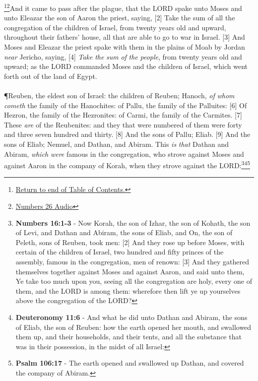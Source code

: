 \footnote{\textcolor[rgb]{0.00,0.25,0.00}{\hyperlink{TOC}{Return to end of Table of Contents.}}}\footnote{\href{https://audiobible.com/bible/numbers_26.html}{\textcolor[cmyk]{0.99998,1,0,0}{Numbers 26 Audio}}}\textcolor[cmyk]{0.99998,1,0,0}{And it came to pass after the plague, that the LORD spake unto Moses and unto Eleazar the son of Aaron the priest, saying,}
[2] \textcolor[cmyk]{0.99998,1,0,0}{Take the sum of all the congregation of the children of Israel, from twenty years old and upward, throughout their fathers' house, all that are able to go to war in Israel.}
[3] \textcolor[cmyk]{0.99998,1,0,0}{And Moses and Eleazar the priest spake with them in the plains of Moab by Jordan \emph{near} Jericho, saying,}
[4] \textcolor[cmyk]{0.99998,1,0,0}{\emph{Take} \emph{the} \emph{sum} \emph{of} \emph{the} \emph{people}, from twenty years old and upward; as the LORD commanded Moses and the children of Israel, which went forth out of the land of Egypt.}\\
\\
\P \textcolor[cmyk]{0.99998,1,0,0}{Reuben, the eldest son of Israel: the children of Reuben; Hanoch, \emph{of} \emph{whom} \emph{cometh} the family of the Hanochites: of Pallu, the family of the Palluites:}
[6] \textcolor[cmyk]{0.99998,1,0,0}{Of Hezron, the family of the Hezronites: of Carmi, the family of the Carmites.}
[7] \textcolor[cmyk]{0.99998,1,0,0}{These \emph{are}  of the Reubenites: and they that were numbered of them were forty and three  seven hundred and thirty.}
[8] \textcolor[cmyk]{0.99998,1,0,0}{And the sons of Pallu; Eliab.}
[9] \textcolor[cmyk]{0.99998,1,0,0}{And the sons of Eliab; Nemuel, and Dathan, and Abiram. This \emph{is} \emph{that} Dathan and Abiram, \emph{which} \emph{were} famous in the congregation, who strove against Moses and against Aaron in the company of Korah, when they strove against the LORD:}\footnote{\textbf{Numbers 16:1-3} - Now Korah, the son of Izhar, the son of Kohath, the son of Levi, and Dathan and Abiram, the sons of Eliab, and On, the son of Peleth, sons of Reuben, took men: [2] And they rose up before Moses, with certain of the children of Israel, two hundred and fifty princes of the assembly, famous in the congregation, men of renown: [3] And they gathered themselves together against Moses and against Aaron, and said unto them, Ye take too much upon you, seeing all the congregation are holy, every one of them, and the LORD is among them: wherefore then lift ye up yourselves above the congregation of the LORD?}\footnote{\textbf{Deuteronomy 11:6} - And what he did unto Dathan and Abiram, the sons of Eliab, the son of Reuben: how the earth opened her mouth, and swallowed them up, and their households, and their tents, and all the substance that was in their possession, in the midst of all Israel:}\footnote{\textbf{Psalm 106:17} - The earth opened and swallowed up Dathan, and covered the company of Abiram.}
